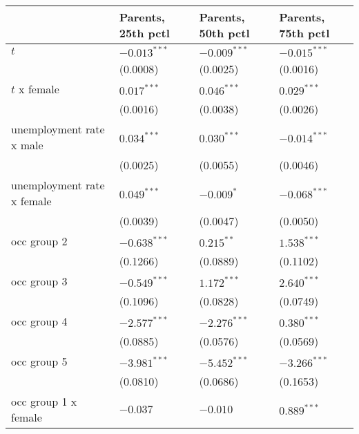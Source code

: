 \begin{tabular}{llll}
\toprule
{} & Parents, 25th pctl & Parents, 50th pctl & Parents, 75th pctl \\
\midrule
$t$                                    &     $-0.013^{***}$ &     $-0.009^{***}$ &     $-0.015^{***}$ \\
                                       &           (0.0008) &           (0.0025) &           (0.0016) \\
$t$ x female                           &      $0.017^{***}$ &      $0.046^{***}$ &      $0.029^{***}$ \\
                                       &           (0.0016) &           (0.0038) &           (0.0026) \\
unemployment rate x male               &      $0.034^{***}$ &      $0.030^{***}$ &     $-0.014^{***}$ \\
                                       &           (0.0025) &           (0.0055) &           (0.0046) \\
unemployment rate x female             &      $0.049^{***}$ &         $-0.009^*$ &     $-0.068^{***}$ \\
                                       &           (0.0039) &           (0.0047) &           (0.0050) \\
occ group 2                            &     $-0.638^{***}$ &       $0.215^{**}$ &      $1.538^{***}$ \\
                                       &           (0.1266) &           (0.0889) &           (0.1102) \\
occ group 3                            &     $-0.549^{***}$ &      $1.172^{***}$ &      $2.640^{***}$ \\
                                       &           (0.1096) &           (0.0828) &           (0.0749) \\
occ group 4                            &     $-2.577^{***}$ &     $-2.276^{***}$ &      $0.380^{***}$ \\
                                       &           (0.0885) &           (0.0576) &           (0.0569) \\
occ group 5                            &     $-3.981^{***}$ &     $-5.452^{***}$ &     $-3.266^{***}$ \\
                                       &           (0.0810) &           (0.0686) &           (0.1653) \\
occ group 1 x female                   &           $-0.037$ &           $-0.010$ &      $0.889^{***}$ \\

\end{tabular}
